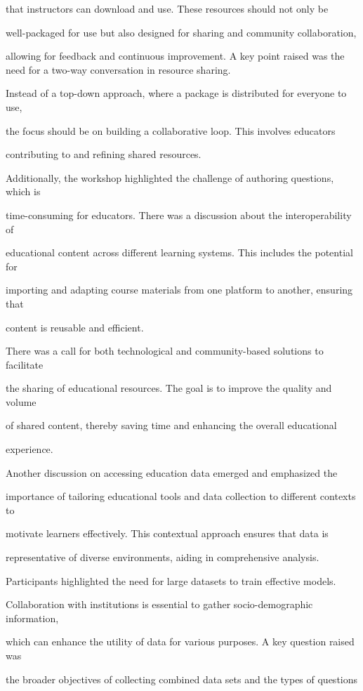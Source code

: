 \documentclass[11pt]{article}
\begin{document}
that instructors can download and use. These resources should not only be

well-packaged for use but also designed for sharing and community collaboration,

allowing for feedback and continuous improvement. A key point raised was the need for a two-way conversation in resource sharing.

Instead of a top-down approach, where a package is distributed for everyone to use,

the focus should be on building a collaborative loop. This involves educators

contributing to and refining shared resources.

Additionally, the workshop highlighted the challenge of authoring questions, which is

time-consuming for educators. There was a discussion about the interoperability of

educational content across different learning systems. This includes the potential for

importing and adapting course materials from one platform to another, ensuring that

content is reusable and efficient.

There was a call for both technological and community-based solutions to facilitate

the sharing of educational resources. The goal is to improve the quality and volume

of shared content, thereby saving time and enhancing the overall educational

experience.

Another discussion on accessing education data emerged and emphasized the

importance of tailoring educational tools and data collection to different contexts to

motivate learners effectively. This contextual approach ensures that data is

representative of diverse environments, aiding in comprehensive analysis.

Participants highlighted the need for large datasets to train effective models.

Collaboration with institutions is essential to gather socio-demographic information,

which can enhance the utility of data for various purposes. A key question raised was

the broader objectives of collecting combined data sets and the types of questions
\end{document}
